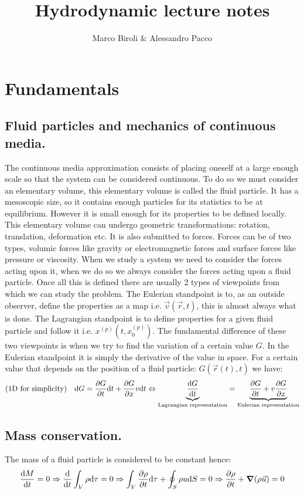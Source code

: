 \documentclass[10pt,a4paper]{book}
\title{Hydrodynamic lecture notes}
\author{Marco Biroli \& Alessandro Pacco}
\begin{document}
\maketitle

\chapter{Fundamentals}
\section{Fluid particles and mechanics of continuous media.}

The continuous media approximation consists of placing oneself at a large enough scale so that the system can be considered continuous. To do so we must consider an elementary volume, this elementary volume is called the fluid particle. It has a mesoscopic size, so it contains enough particles for its statistics to be at equilibrium. However it is small enough for its properties to be defined locally. This elementary volume can undergo geometric transformations: rotation, translation, deformation etc. It is also submitted to forces. Forces can be of two types, volumic forces like gravity or electromagnetic forces and surface forces like pressure or viscosity. When we study a system we need to consider the forces acting upon it, when we do so we always consider the forces acting upon a fluid particle. Once all this is defined there are usually 2 types of viewpoints from which we can study the problem. The Eulerian standpoint is to, as an outside observer, define the properties as a map i.e. $\vec{v}(\vec{r}, t)$, this is almost always what is done. The Lagrangian standpoint is to define properties for a given fluid particle and follow it i.e. $x^{(p)} (t, x_0^{(p)})$. The fundamental difference of these two viewpoints is when we try to find the variation of a certain value $G$. In the Eulerian standpoint it is simply the derivative of the value in space. For a certain value that depends on the position of a fluid particle: $G(\vec{r}(t), t)$ we have:
\[
(1 \text{D for simplicity}) \quad \dd G = \pdv{G}{t} \dd t + \pdv{G}{x} v \dd t \Leftrightarrow \underbrace{\dv{G}{t}}_{\text{Lagrangian representation}} = \underbrace{\pdv{G}{t} + v \pdv{G}{x}}_\text{Eulerian representation}
\]

\section{Mass conservation.}
The mass of a fluid particle is considered to be constant hence:
\[
\dv{M}{t} = 0 \Rightarrow \dv{}{t}\int_{V} \rho \dd \tau = 0 \Rightarrow \int_V \pdv{\rho}{t} \dd \tau + \oint_S \rho  u \dd S = 0 \Rightarrow \pdv{\rho}{t} + \grad (\rho \vec{u}) = 0
\]
\end{document}

